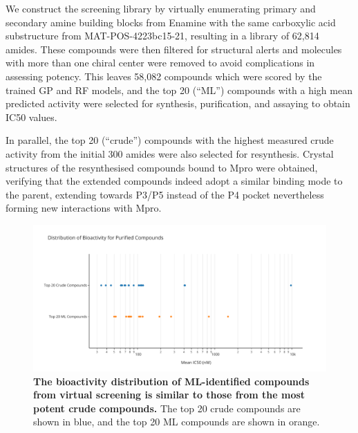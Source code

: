 We construct the screening library by virtually enumerating primary and secondary amine building blocks from Enamine with the same carboxylic acid substructure from MAT-POS-4223bc15-21, resulting in a library of 62,814 amides. These compounds were then filtered for structural alerts and molecules with more than one chiral center were removed to avoid complications in assessing potency. This leaves 58,082 compounds which were scored by the trained GP and RF models, and the top 20 (``ML'') compounds with a high mean predicted activity were selected for synthesis, purification, and assaying to obtain IC50 values.


In parallel, the top 20 (``crude'') compounds with the highest measured crude activity from the initial 300 amides were also selected for resynthesis. Crystal structures of the resynthesised compounds bound to Mpro were obtained, verifying that the extended compounds indeed adopt a similar binding mode to the parent, extending towards P3/P5 instead of the P4 pocket nevertheless forming new interactions with Mpro.

\begin{figure}[!]
 \centering
 \includegraphics[width=\textwidth]{Chapters/Crude/Figs/strip_plot.pdf}
 \caption{\textbf{The bioactivity distribution of ML-identified compounds from virtual screening is similar to those from the most potent crude compounds.} The top 20 crude compounds are shown in blue, and the top 20 ML compounds are shown in orange.}
 \label{fig:strip}
\end{figure}

